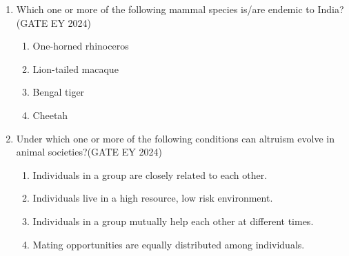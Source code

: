 \begin{enumerate}
\item Which one or more of the following mammal species is/are endemic to India?\hfill{(GATE EY 2024)}
    \begin{multicols}{2}
    \begin{enumerate}
        \item One-horned rhinoceros
        \item Lion-tailed macaque
        \item Bengal tiger
        \item Cheetah
    \end{enumerate}
    \end{multicols}

\item Under which one or more of the following conditions can altruism evolve in animal societies?\hfill{(GATE EY 2024)}
    \begin{enumerate}
        \item Individuals in a group are closely related to each other.
        \item Individuals live in a high resource, low risk environment.
        \item Individuals in a group mutually help each other at different times.
        \item Mating opportunities are equally distributed among individuals.
    \end{enumerate}


\end{enumerate}
